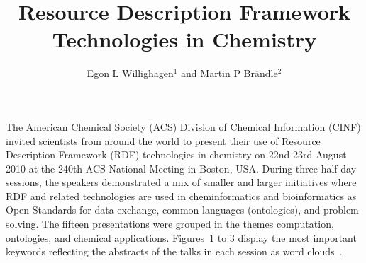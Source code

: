 \documentclass[10pt]{bmc_article}
\newenvironment{bmcformat}{\begin{raggedright}\baselineskip20pt\sloppy\setboolean{publ}{false}}{\end{raggedright}\baselineskip20pt\sloppy}
\begin{document}
\begin{bmcformat}

\title{Resource Description Framework Technologies in Chemistry}
 
\author{Egon L Willighagen\correspondingauthor$^{1}$%
       and 
         Martin P Br\"andle$^2$%
      }

\address{%
    \iid(1)Division of Molecular Toxicology, Institute of Environmental Medicine, Karolinska Institutet, SE-17177 Stockholm, Sweden\\
    \iid(2)Chemistry Biology Pharmacy Information Center, ETH Z\"urich, Wolfgang-Pauli-Str. 10, 8093 Z\"urich, Switzerland
}%

\maketitle




The American Chemical Society (ACS) Division of Chemical Information (CINF)
invited scientists from around the world to present their use of Resource
Description Framework (RDF) technologies in chemistry on 22nd-23rd August 2010
at the 240th ACS National Meeting in Boston, USA. During three half-day
sessions, the speakers demonstrated a mix of smaller and larger initiatives
where RDF and related technologies are used in cheminformatics and
bioinformatics as Open Standards for data exchange, common languages
(ontologies), and problem solving. The fifteen presentations were grouped in the themes computation,
ontologies, and chemical applications. Figures~1 to 3 display the most important
keywords reflecting the abstracts of the talks in each session as word
clouds~\cite{WORDLE}.


\end{bmcformat}
\end{document}
